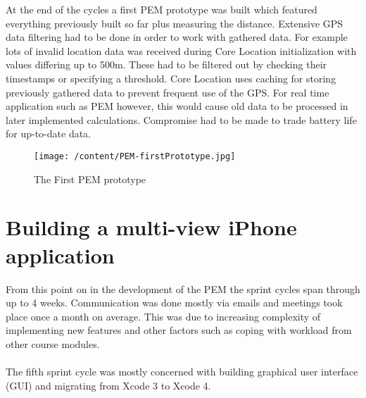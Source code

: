 \documentclass[12pt, a4paper]{report}   %
\begin{document}
\begin{enumerate}
At the end of the cycles a first PEM prototype was built which featured everything previously built so far plus measuring the distance. Extensive GPS data filtering had to be done in order to work with gathered data. For example lots of invalid location data was received during Core Location initialization with values differing up to 500m. These had to be filtered out by checking their timestamps or specifying a threshold. Core Location uses caching for storing previously gathered data to prevent frequent use of the GPS. For real time application such as PEM however, this would cause old data to be processed in later implemented calculations. Compromise had to be made to trade battery life for up-to-date data.


\begin{figure}[H]
  \centering
	\texttt{[image: /content/PEM-firstPrototype.jpg]}
	  \caption{The First PEM prototype}
\end{figure}


\clearpage
\section{Building a multi-view iPhone application}
From this point on in the development of the PEM the sprint cycles span through up to 4 weeks. Communication was done mostly via emails and meetings took place once a month on average. This was due to increasing complexity of implementing new features and other factors such as coping with workload from other course modules.\\ \\
The fifth sprint cycle was mostly concerned with building graphical user interface (GUI) and migrating from Xcode 3 to Xcode 4.


\end{enumerate}
\end{document}
